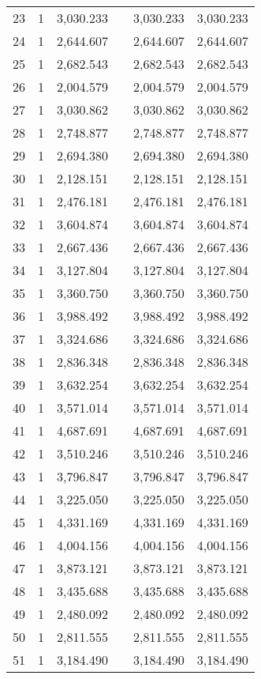 \begin{table}[!htbp]
\begin{tabular}{@{\extracolsep{5pt}}lccccc}
23 & 1 & 3,030.233 &  & 3,030.233 & 3,030.233 \\ 
24 & 1 & 2,644.607 &  & 2,644.607 & 2,644.607 \\ 
25 & 1 & 2,682.543 &  & 2,682.543 & 2,682.543 \\ 
26 & 1 & 2,004.579 &  & 2,004.579 & 2,004.579 \\ 
27 & 1 & 3,030.862 &  & 3,030.862 & 3,030.862 \\ 
28 & 1 & 2,748.877 &  & 2,748.877 & 2,748.877 \\ 
29 & 1 & 2,694.380 &  & 2,694.380 & 2,694.380 \\ 
30 & 1 & 2,128.151 &  & 2,128.151 & 2,128.151 \\ 
31 & 1 & 2,476.181 &  & 2,476.181 & 2,476.181 \\ 
32 & 1 & 3,604.874 &  & 3,604.874 & 3,604.874 \\ 
33 & 1 & 2,667.436 &  & 2,667.436 & 2,667.436 \\ 
34 & 1 & 3,127.804 &  & 3,127.804 & 3,127.804 \\ 
35 & 1 & 3,360.750 &  & 3,360.750 & 3,360.750 \\ 
36 & 1 & 3,988.492 &  & 3,988.492 & 3,988.492 \\ 
37 & 1 & 3,324.686 &  & 3,324.686 & 3,324.686 \\ 
38 & 1 & 2,836.348 &  & 2,836.348 & 2,836.348 \\ 
39 & 1 & 3,632.254 &  & 3,632.254 & 3,632.254 \\ 
40 & 1 & 3,571.014 &  & 3,571.014 & 3,571.014 \\ 
41 & 1 & 4,687.691 &  & 4,687.691 & 4,687.691 \\ 
42 & 1 & 3,510.246 &  & 3,510.246 & 3,510.246 \\ 
43 & 1 & 3,796.847 &  & 3,796.847 & 3,796.847 \\ 
44 & 1 & 3,225.050 &  & 3,225.050 & 3,225.050 \\ 
45 & 1 & 4,331.169 &  & 4,331.169 & 4,331.169 \\ 
46 & 1 & 4,004.156 &  & 4,004.156 & 4,004.156 \\ 
47 & 1 & 3,873.121 &  & 3,873.121 & 3,873.121 \\ 
48 & 1 & 3,435.688 &  & 3,435.688 & 3,435.688 \\ 
49 & 1 & 2,480.092 &  & 2,480.092 & 2,480.092 \\ 
50 & 1 & 2,811.555 &  & 2,811.555 & 2,811.555 \\ 
51 & 1 & 3,184.490 &  & 3,184.490 & 3,184.490 \\ 

\end{tabular}
\end{table}
